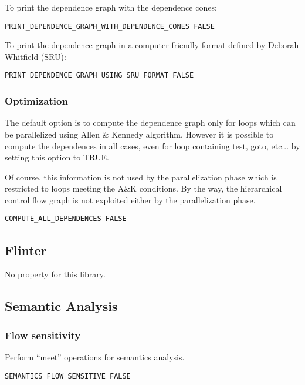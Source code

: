 To print the dependence graph with the dependence cones:

\begin{verbatim}
PRINT_DEPENDENCE_GRAPH_WITH_DEPENDENCE_CONES FALSE
\end{verbatim}

To print the dependence graph in a computer friendly format defined by
Deborah Whitfield (SRU):

\begin{verbatim}
PRINT_DEPENDENCE_GRAPH_USING_SRU_FORMAT FALSE
\end{verbatim}

\subsubsection{Optimization}

The default option is to compute the dependence graph only for loops
which can be parallelized using Allen \& Kennedy algorithm.  However it
is possible to compute the dependences in all cases, even for loop
containing test, goto, etc...  by setting this option to TRUE.

Of course, this information is not used by the parallelization phase
which is restricted to loops meeting the A\&K conditions. By the way,
the hierarchical control flow graph is not exploited either by the
parallelization phase.

\begin{verbatim}
COMPUTE_ALL_DEPENDENCES FALSE
\end{verbatim}

\subsection{Flinter}

No property for this library.

\subsection{Semantic Analysis}
\label{subsection-semantic-analysis}

\subsubsection{Flow sensitivity}

Perform ``meet'' operations for semantics analysis.

\begin{verbatim}
SEMANTICS_FLOW_SENSITIVE FALSE
\end{verbatim}

